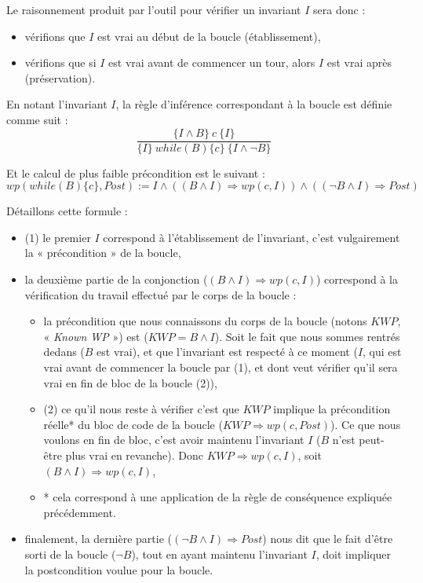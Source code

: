 Le raisonnement produit par l'outil pour vérifier un invariant $I$ sera donc :



\begin{itemize}
\item vérifions que $I$ est vrai au début de la boucle (établissement),
\item vérifions que si $I$ est vrai avant de commencer un tour, alors $I$ est vrai après (préservation).
\end{itemize}




En notant l'invariant $I$, la règle d'inférence correspondant à la boucle est
définie comme suit :
$$\dfrac{\{I \wedge B \}\ c\ \{I\}}{\{I\}\ while(B)\{c\}\ \{I \wedge \neg B\}}$$


Et le calcul de plus faible précondition est le suivant :
$$wp(while (B) \{ c \}, Post) := I \wedge ((B \wedge I) \Rightarrow wp(c, I)) \wedge ((\neg B \wedge I) \Rightarrow Post)$$


Détaillons cette formule :



\begin{itemize}
\item (1) le premier $I$ correspond à l'établissement de l'invariant, c'est
vulgairement la « précondition » de la boucle,
\item la deuxième partie de la conjonction ($(B \wedge I) \Rightarrow wp(c, I)$)
correspond à la vérification du travail effectué par le corps de la boucle :

\begin{itemize}
\item la précondition que nous connaissons du corps de la boucle (notons $KWP$,
« \textit{Known WP} ») est ($KWP = B \wedge I$). Soit le fait que nous sommes
rentrés dedans ($B$ est vrai), et que l'invariant est respecté à ce moment
($I$, qui est vrai avant de commencer la boucle par (1), et dont veut
vérifier qu'il sera vrai en fin de bloc de la boucle (2)),
\item (2) ce qu'il nous reste à vérifier c'est que $KWP$ implique la
précondition réelle* du bloc de code de la boucle
  ($KWP \Rightarrow wp(c, Post)$). Ce que nous voulons en fin de bloc,
  c'est avoir maintenu l'invariant $I$ ($B$ n'est peut-être plus vrai en
  revanche). Donc
$KWP \Rightarrow wp(c, I)$, soit $(B \wedge I) \Rightarrow wp(c, I)$,
\item * cela correspond à une application de la règle de conséquence expliquée
précédemment.
\end{itemize}
\item finalement, la dernière partie ($(\neg B \wedge I) \Rightarrow Post$)
nous dit que le fait d'être sorti de la boucle ($\neg B$), tout en ayant
maintenu l'invariant $I$, doit impliquer la postcondition voulue pour la
boucle.
\end{itemize}


